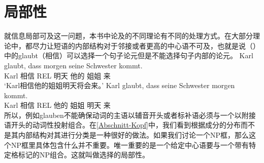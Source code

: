 
\section{局部性}
\label{Abschnitt-Diskussion-Lokalitaet}\label{sec-locality}

就信息局部可及这一问题，本书中论及的不同理论有不同的处理方式。在大部分理论中，都尽力让短语的内部结构对于邻接或者更高的中心语不可及，也就是说（）中的glaubt（相信）可以选择一个句子论元但是不能选择句子内部的论元。
\eal
\ex 
\gll Karl glaubt, dass morgen seine Schwester kommt.\\
	 Karl 相信 REL 明天 他的 姐姐 来\\
\glt `Karl相信他的姐姐明天将会来。'
\ex 
\gll Karl glaubt, dass seine Schwester morgen kommt.\\
	 Karl 相信 REL 他的 姐姐 明天 来\\
\zl
所以，例如glauben不能确保动词的主语以辅音开头或者标补语必须与一个以附接语开头的动词性投射组合。在\ref{Abschnitt-Kopf}中，我们看到根据成分的分布而不是其内部结构对其进行分类是一种很好的做法。如果我们讨论一个NP框，那么这个NP框里具体包含什么并不重要。唯一重要的是一个给定中心语要与一个带有特定格标记的NP组合。这就叫做选择的局部性。

